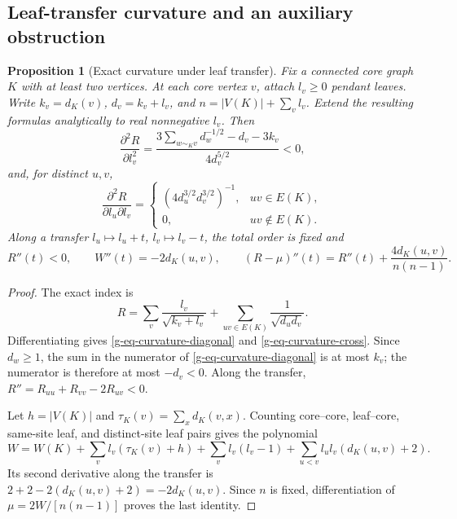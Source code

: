 \documentclass[11pt,a4paper]{article}
\newtheorem{proposition}[theorem]{Proposition}
\theoremstyle{definition}
\theoremstyle{remark}
\begin{document}
\subsection{Leaf-transfer curvature and an auxiliary obstruction}
\label{g-sub-curvature}

\begin{proposition}[Exact curvature under leaf transfer]
\label{g-prop-leaf-curvature}
Fix a connected core graph $K$ with at least two vertices.  At each core
vertex $v$, attach $l_v\ge0$ pendant leaves.  Write $k_v=d_K(v)$,
$d_v=k_v+l_v$, and $n=|V(K)|+\sum_vl_v$.  Extend the resulting formulas
analytically to real nonnegative $l_v$.  Then
\begin{equation}
 \frac{\partial^2R}{\partial l_v^2}
 =\frac{3\sum_{w\sim_Kv}d_w^{-1/2}-d_v-3k_v}{4d_v^{5/2}}<0,
 \label{g-eq-curvature-diagonal}
\end{equation}
and, for distinct $u,v$,
\begin{equation}
 \frac{\partial^2R}{\partial l_u\partial l_v}
 =\begin{cases}
 (4d_u^{3/2}d_v^{3/2})^{-1},&uv\in E(K),\\
 0,&uv\notin E(K).
 \end{cases}
 \label{g-eq-curvature-cross}
\end{equation}
Along a transfer $l_u\mapsto l_u+t$, $l_v\mapsto l_v-t$, the total
order is fixed and
\begin{equation}
 R''(t)<0,\qquad W''(t)=-2d_K(u,v),\qquad
 (R-\mu)''(t)=R''(t)+\frac{4d_K(u,v)}{n(n-1)}.
 \label{g-eq-transfer-curvature}
\end{equation}
\end{proposition}

\begin{proof}
The exact index is
\[
 R=\sum_v\frac{l_v}{\sqrt{k_v+l_v}}
   +\sum_{uv\in E(K)}\frac1{\sqrt{d_ud_v}}.
\]
Differentiating gives \eqref{g-eq-curvature-diagonal} and
\eqref{g-eq-curvature-cross}.  Since $d_w\ge1$, the sum in the
numerator of \eqref{g-eq-curvature-diagonal} is at most $k_v$; the
numerator is therefore at most $-d_v<0$.  Along the transfer,
$R''=R_{uu}+R_{vv}-2R_{uv}<0$.

Let $h=|V(K)|$ and $\tau_K(v)=\sum_xd_K(v,x)$.  Counting core--core,
leaf--core, same-site leaf, and distinct-site leaf pairs gives the
polynomial
\[
 W=W(K)+\sum_v l_v(\tau_K(v)+h)
       +\sum_vl_v(l_v-1)
       +\sum_{u<v}l_ul_v(d_K(u,v)+2).
\]
Its second derivative along the transfer is
$2+2-2(d_K(u,v)+2)=-2d_K(u,v)$.  Since $n$ is fixed, differentiation
of $\mu=2W/[n(n-1)]$ proves the last identity.
\end{proof}
\end{document}
